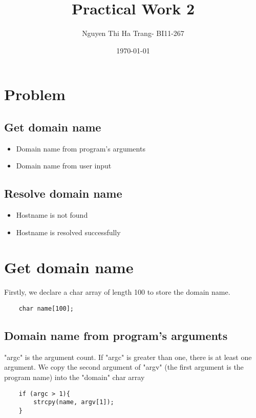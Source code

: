 \documentclass[12pt]{article}
\begin{document}


\begin{titlepage}
    \title{\textbf{\LARGE{Practical Work 2}}}
    \author{\LARGE{Nguyen Thi Ha Trang- BI11-267 }}
    \date{\Large{\today}}
\end{titlepage}
\newpage

\maketitle

\section{Problem}
\subsection{Get domain name}
\begin{itemize}
    \item Domain name from program's arguments
    \item Domain name from user input
\end{itemize}

\subsection{Resolve domain name}
\begin{itemize}
    \item Hostname is not found
    \item Hostname is resolved successfully
\end{itemize}

\section{Get domain name}
Firstly, we declare a char array of length 100 to store the domain name.
\begin{verbatim}
    char name[100];
\end{verbatim}
\subsection{Domain name from program's arguments}
"argc" is the argument count. If "argc" is greater than one, there is at least one argument. We copy the second argument of "argv" (the first argument is the program name) into the "domain" char array
\begin{verbatim}
    if (argc > 1){
        strcpy(name, argv[1]);
    }\end{verbatim}
\end{document}
